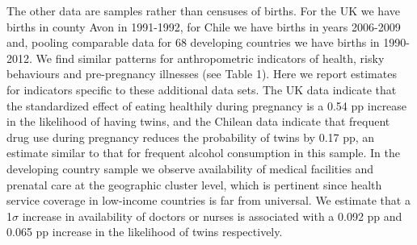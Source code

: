 \documentclass{nature}
\begin{document}
\begin{linenumbers}
The other data are samples rather than censuses of births. For the UK we have births in county Avon in 1991-1992, for Chile we have births in years 2006-2009 and, pooling comparable data for 68 developing countries we have births in 1990-2012. We find similar patterns for anthropometric indicators of health, risky behaviours and pre-pregnancy illnesses (see Table 1). Here we report estimates for indicators specific to these additional data sets. %
The UK data indicate that the standardized effect of eating healthily during pregnancy is a 0.54 pp increase in the likelihood of having twins, 
and the Chilean data indicate that frequent drug use during pregnancy reduces the probability of twins by 0.17 pp, an estimate similar to that for frequent alcohol consumption in this sample. In the developing country sample we observe availability of medical facilities and prenatal care at the geographic cluster level, which is pertinent since health service coverage in low-income countries is far from universal. We estimate that a 1$\sigma$ increase in  availability of doctors or nurses is associated with a 0.092 pp and 0.065 pp increase in the likelihood of twins respectively. %



\end{linenumbers}
\end{document}
